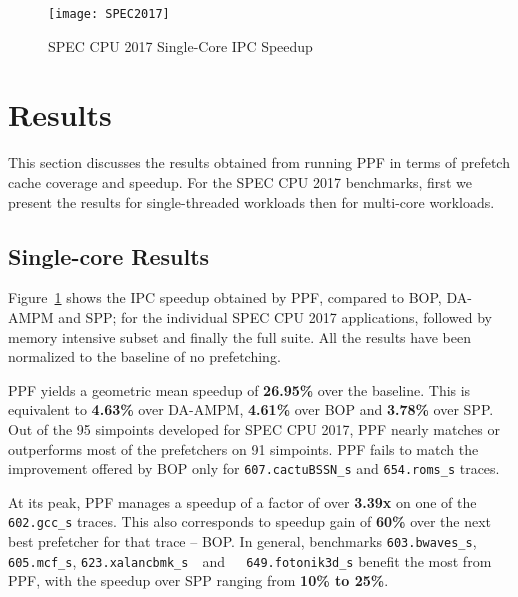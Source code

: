\begin{figure}[ht]
\texttt{[image: SPEC2017]}
\caption{SPEC CPU 2017 Single-Core IPC Speedup}
\label{Fig:SPEC2017_1core}
\end{figure}

\section{Results}
\label{Results}

This section discusses the results obtained from running PPF in terms of
prefetch cache coverage and speedup. For the SPEC CPU 2017 benchmarks, first
we present the results for single-threaded workloads then for multi-core
workloads.

\subsection{Single-core Results}
\label{Results-Single}


Figure~\ref{Fig:SPEC2017_1core} shows the IPC speedup obtained by PPF,
compared to BOP, DA-AMPM and SPP; for the individual SPEC CPU 2017 
applications, followed by memory intensive subset and finally the full
suite. All the results have been normalized to the baseline of no prefetching.


PPF yields a geometric mean speedup of \textbf{26.95\%} over the baseline. 
This is equivalent to \textbf{4.63\%} over DA-AMPM, \textbf{4.61\%} over BOP 
and \textbf{3.78\%} over SPP. Out of the 95 simpoints developed for SPEC 
CPU 2017, PPF nearly matches or outperforms most of the prefetchers on 91 
simpoints. PPF fails to match the improvement offered by BOP only for 
{\tt 607.cactuBSSN\_s} and {\tt 654.roms\_s} traces.

At its peak, PPF manages a speedup of a factor of over \textbf{3.39x} on one of the
{\tt 602.gcc\_s} traces. This also corresponds to speedup gain of
\textbf{60\%} over the next best prefetcher for that trace -- BOP. In general, benchmarks
{\tt 603.bwaves\_s}, {\tt 605.mcf\_s}, {\tt {623.xalancbmk}\_s}~~and~~{\tt
649.fotonik3d\_s}  benefit the most from PPF, with the speedup over SPP ranging
from \textbf{10\% to 25\%}.

